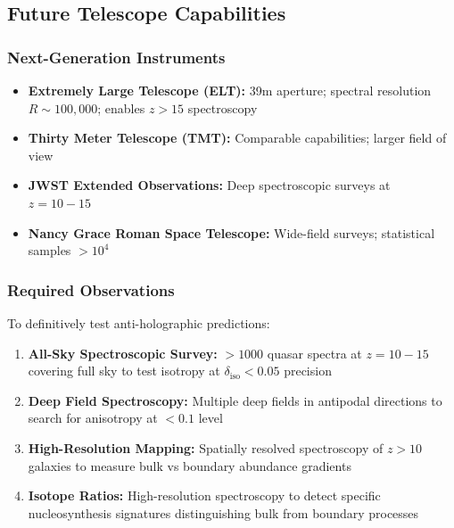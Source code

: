 \documentclass[twocolumn,aps,prd,superscriptaddress,nofootinbib]{revtex4-2}
\begin{document}
\subsection{Future Telescope Capabilities}

\subsubsection{Next-Generation Instruments}

\begin{itemize}
    \item \textbf{Extremely Large Telescope (ELT):} 39m aperture; spectral resolution $R \sim 100,000$; enables $z > 15$ spectroscopy
    
    \item \textbf{Thirty Meter Telescope (TMT):} Comparable capabilities; larger field of view
    
    \item \textbf{JWST Extended Observations:} Deep spectroscopic surveys at $z = 10-15$
    
    \item \textbf{Nancy Grace Roman Space Telescope:} Wide-field surveys; statistical samples $> 10^4$
\end{itemize}

\subsubsection{Required Observations}

To definitively test anti-holographic predictions:

\begin{enumerate}
    \item \textbf{All-Sky Spectroscopic Survey:} $> 1000$ quasar spectra at $z = 10-15$ covering full sky to test isotropy at $\delta_{\text{iso}} < 0.05$ precision
    
    \item \textbf{Deep Field Spectroscopy:} Multiple deep fields in antipodal directions to search for anisotropy at $< 0.1$ level
    
    \item \textbf{High-Resolution Mapping:} Spatially resolved spectroscopy of $z > 10$ galaxies to measure bulk vs boundary abundance gradients
    
    \item \textbf{Isotope Ratios:} High-resolution spectroscopy to detect specific nucleosynthesis signatures distinguishing bulk from boundary processes
\end{enumerate}
\end{document}
